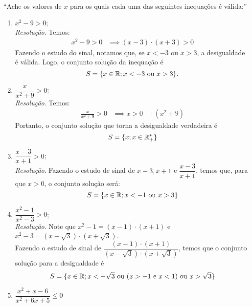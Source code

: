 \enquote{Ache os valores de $x$ para os quais cada uma das seguintes inequações é válida:}
\begin{enumerate}
    \item $x^2 - 9 > 0$;
    \\
    \emph{Resolução}. Temos:
    \begin{align*}
        x^2 - 9 > 0 & \implies (x - 3) \cdot (x + 3) > 0
    \end{align*}
    Fazendo o estudo do sinal, notamos que, se $x < -3$ ou $x > 3$, a desigualdade é válida. Logo, o conjunto solução da inequação é
    \begin{displaymath}
        S = \{ x \in \mathbb R; x < -3 \text{ ou } x > 3 \}.
    \end{displaymath}
    \item $\dfrac{x}{x^2 + 9} > 0$;
    \\
    \emph{Resolução}. Temos:
    \begin{align*}
        \frac{x}{x^2 + 9} > 0 & \implies x > 0
        \quad \cdot(x^2 + 9)
    \end{align*}
    Portanto, o conjunto solução que torna a desigualdade verdadeira é
    \begin{displaymath}
        S = \{x; x \in \mathbb R_+^* \}
    \end{displaymath}
    \item $\dfrac{x - 3}{x + 1} > 0$;
    \\
    \emph{Resolução}. Fazendo o estudo de sinal de $x - 3, x + 1$ e $\dfrac{x-3}{x+1}$, temos que, para que $x > 0$, o conjunto solução será:
    \begin{displaymath}
        S = \{ x \in \mathbb R; x < -1 \text{ ou } x > 3 \}
    \end{displaymath}
    \item $\dfrac{x^2 - 1}{x^2 - 3} > 0$;
    \\
    \emph{Resolução}. Note que $x^2 - 1 = (x - 1) \cdot (x + 1)$ e $x^2 - 3 = (x - \sqrt{3}) \cdot (x + \sqrt{3})$. \\ 
    Fazendo o estudo de sinal de $\dfrac{(x - 1) \cdot (x + 1)}{(x - \sqrt{3}) \cdot (x + \sqrt{3})}$, temos que o conjunto solução para a desigualdade é
    \begin{displaymath}
        S = \{x \in \mathbb R; x < -\sqrt{3} \text{ ou } (x > -1 \text{ e } x < 1) \text{ ou } x > \sqrt{3} \}
    \end{displaymath}
    \item $\dfrac{x^2 + x - 6}{x^2 + 6x + 5} \le 0$
    \\

\end{enumerate}
